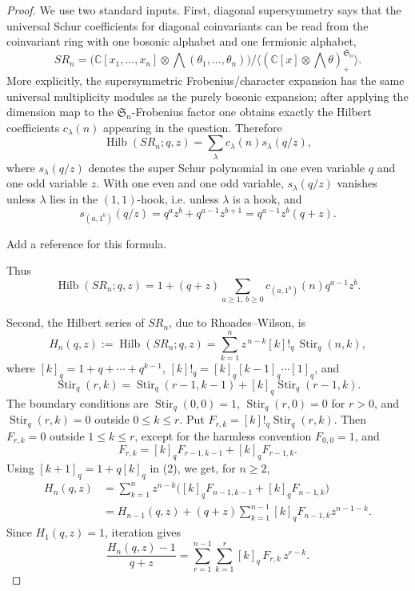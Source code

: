\documentclass[12pt]{article}
\newcommand{\Hilb}{\operatorname{Hilb}}
\newcommand{\Stir}{\operatorname{Stir}}
\newcommand{\review}[1]{\begin{reviewbox}#1\end{reviewbox}}
\begin{document}
\begin{proof}
We use two standard inputs.  First, diagonal supersymmetry says that the
universal Schur coefficients for diagonal coinvariants can be read from the
coinvariant ring with one bosonic alphabet and one fermionic alphabet,
\[
 SR_n=\bigl(\mathbb C[x_1,\ldots,x_n]\otimes
          \bigwedge(\theta_1,\ldots,\theta_n)\bigr)
/\langle(\mathbb C[x]\otimes\bigwedge\theta)^{\mathfrak S_n}_{+}\rangle .
\]
More explicitly, the supersymmetric Frobenius/character expansion has the same
universal multiplicity modules as the purely bosonic expansion; after applying
the dimension map to the \(\mathfrak S_n\)-Frobenius factor one obtains exactly
the Hilbert coefficients \(c_\lambda(n)\) appearing in the question.  Therefore
\[
        \Hilb(SR_n;q,z)=\sum_\lambda c_\lambda(n)s_\lambda(q/z),
\]
where \(s_\lambda(q/z)\) denotes the super Schur polynomial in one even variable
\(q\) and one odd variable \(z\).  With one even and one odd variable,
\(s_\lambda(q/z)\) vanishes unless \(\lambda\) lies in the \((1,1)\)-hook, i.e.
unless \(\lambda\) is a hook, and
\[
        s_{(a,1^b)}(q/z)=q^a z^b+q^{a-1}z^{b+1}
        =q^{a-1}z^b(q+z).
\]
\review{Add a reference for this formula.}
Thus
\[
        \Hilb(SR_n;q,z)
        =1+(q+z)\sum_{a\ge1,\ b\ge0}
              c_{(a,1^b)}(n)q^{a-1}z^b .          \tag{1}
\]

Second, the Hilbert series of \(SR_n\), due to Rhoades--Wilson, is
\[
        H_n(q,z):=\Hilb(SR_n;q,z)
        =\sum_{k=1}^{n} z^{\,n-k}[k]!_q\,\Stir_q(n,k),                 \tag{2}
\]
where \([k]_q=1+q+\cdots+q^{k-1}\), \([k]!_q=[k]_q[k-1]_q\cdots[1]_q\), and
\[
        \Stir_q(r,k)=\Stir_q(r-1,k-1)+[k]_q\Stir_q(r-1,k).
\]
The boundary conditions are
\(\Stir_q(0,0)=1\), \(\Stir_q(r,0)=0\) for \(r>0\), and
\(\Stir_q(r,k)=0\) outside \(0\le k\le r\).  Put
\(F_{r,k}=[k]!_q\Stir_q(r,k)\).  Then \(F_{r,k}=0\) outside
\(1\le k\le r\), except for the harmless convention \(F_{0,0}=1\), and
\[
        F_{r,k}=[k]_qF_{r-1,k-1}+[k]_qF_{r-1,k}.
\]
Using \([k+1]_q=1+q[k]_q\) in (2), we get, for \(n\ge2\),
\[
\begin{aligned}
H_n(q,z)
&=\sum_{k=1}^{n}z^{n-k}\bigl([k]_qF_{n-1,k-1}
                         +[k]_qF_{n-1,k}\bigr)\\
&=H_{n-1}(q,z)
 +(q+z)\sum_{k=1}^{n-1}[k]_qF_{n-1,k}z^{n-1-k}.
\end{aligned}
\]
Since \(H_1(q,z)=1\), iteration gives
\[
        \frac{H_n(q,z)-1}{q+z}
        =
        \sum_{r=1}^{n-1}\sum_{k=1}^{r}
             [k]_q\,F_{r,k}\,z^{r-k}.                    \tag{3}
\]


\end{proof}
\end{document}
